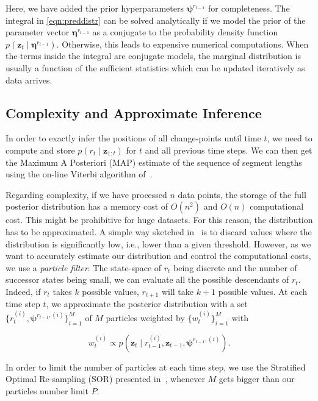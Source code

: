 Here, we have added the prior hyperparameters $\boldsymbol{\psi}^{r_{t-1}}$ for
completeness. The integral in \eqref{eqn:preddistr} can be solved analytically
if we model the prior of the parameter vector $\boldsymbol{\eta}^{r_{t-1}}$ as a
conjugate to the probability density function $p(\mathbf{z}_t\mid
\boldsymbol{\eta}^{r_{t-1}})$. Otherwise, this leads to expensive numerical
computations. When the terms inside the integral are conjugate models, the
marginal distribution is usually a function of the sufficient statistics which
can be updated iteratively as data arrives.

\subsection{Complexity and Approximate Inference}
In order to exactly infer the positions of all change-points until time $t$, we
need to compute and store $p(r_t\mid \mathbf{z}_{1:t})$ for $t$ and all previous
time steps. We can then get the Maximum A Posteriori (MAP) estimate of the
sequence of segment lengths using the on-line Viterbi
algorithm of~\cite{fearnhead07online}.

Regarding complexity, if we have processed $n$ data points, the storage of the
full posterior distribution has a memory cost of $O(n^2)$ and $O(n)$
computational cost. This might be prohibitive for huge datasets. For this
reason, the distribution has to be approximated. A simple way sketched
in~\cite{adams07bayesian} is to discard values where the distribution is
significantly low, i.e., lower than a given threshold. However, as we want to
accurately estimate our distribution and control the computational costs, we use
a \emph{particle filter}. The state-space of $r_t$ being discrete and the number
of successor states being small, we can evaluate all the possible descendants of
$r_t$. Indeed, if $r_t$ takes $k$ possible values, $r_{t+1}$ will take $k+1$
possible values. At each time step $t$, we approximate the posterior
distribution with a set $\{r_t^{(i)},\boldsymbol{\psi}^{r_{t-1},(i)}\}_{i=1}^M$ of
$M$ particles weighted by $\{w_t^{(i)}\}_{i=1}^M$ with

\begin{equation}
\label{eqn:weight}
w_t^{(i)} \propto p(\mathbf{z}_t\mid r_{t-1}^{(i)},\mathbf{z}_{t-1},
\boldsymbol{\psi}^{r_{t-1},(i)}).
\end{equation}

In order to limit the number of particles at each time step, we use the
Stratified Optimal Re-sampling (SOR) presented in~\cite{fearnhead07online},
whenever $M$ gets bigger than our particles number limit $P$.

